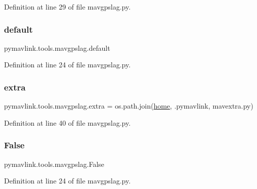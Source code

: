 Definition at line 29 of file mavgpslag.\+py.

\mbox{\label{namespacepymavlink_1_1tools_1_1mavgpslag_a4c27ec5b7da25f8ab0b5b3715485505d}} 
\subsubsection{\texorpdfstring{default}{default}}
{\footnotesize\ttfamily pymavlink.\+tools.\+mavgpslag.\+default}



Definition at line 24 of file mavgpslag.\+py.

\mbox{\label{namespacepymavlink_1_1tools_1_1mavgpslag_ac52ac91c0c51a00372c6261a1a0adbf7}} 
\subsubsection{\texorpdfstring{extra}{extra}}
{\footnotesize\ttfamily pymavlink.\+tools.\+mavgpslag.\+extra = os.\+path.\+join(\mbox{\hyperlink{namespacepymavlink_1_1tools_1_1mavgpslag_a7d947985d356bb2b85e842c2cc11efa5}{home}}, \textquotesingle{}.pymavlink\textquotesingle{}, \textquotesingle{}mavextra.\+py\textquotesingle{})}



Definition at line 40 of file mavgpslag.\+py.

\mbox{\label{namespacepymavlink_1_1tools_1_1mavgpslag_abb466409ddd003bb8b05c555b3547816}} 
\subsubsection{\texorpdfstring{False}{False}}
{\footnotesize\ttfamily pymavlink.\+tools.\+mavgpslag.\+False}



Definition at line 24 of file mavgpslag.\+py.

